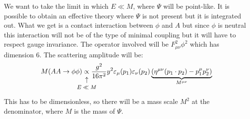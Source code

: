 \documentclass[../main.tex]{subfiles}
\begin{document}
\begin{example}
We want to take the limit in which $E\ll M$, where $\Psi$ will be point-like. It is possible to obtain an effective theory where $\Psi$ is not present but it is integrated out. What we get is a contact interaction between $\phi$ and $A$ but since $\phi$ is neutral this interaction will not be of the type of minimal coupling but it will have to respect gauge invariance. 
The operator involved will be $F^2_{\mu\nu}\phi^2$ which has dimension 6. The scattering amplitude will be:
\[
M(AA\to\phi\phi)\underset{\mathclap{\tikz \node {$\uparrow$} node [below=1ex] {\footnotesize $E\ll M$ };}}{\propto}\frac{g^2}{16\pi^2}y^2\varepsilon_\mu(p_1)\varepsilon_\nu(p_2)\underbrace{(\eta^{\mu\nu}(p_1\cdot p_2)-p_1^\mu p_2^\nu)}_{M^{\mu\nu}}
\]
This has to be dimensionless, so there will be a mass scale $M^2$ at the denominator, where $M$ is the mass of $\Psi$.
\end{example}
\end{document}
